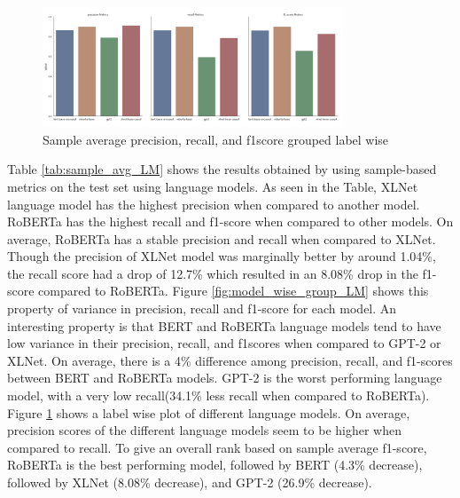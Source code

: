 \begin{figure}[h!]
    \centering
    \includegraphics[width=0.8\textwidth]{thesis/figures/labelwise_wise_prf.png}
    \caption{Sample average precision, recall, and f1score grouped label wise }
    \label{fig:label_wise_group_LM}
\end{figure}
Table \ref{tab:sample_avg_LM} shows the results obtained by using sample-based metrics on the test set using language models. As seen in the Table, XLNet language model has the highest precision when compared to another model.  RoBERTa has the highest recall and f1-score when compared to other models. On average, RoBERTa has a stable precision and recall when compared to XLNet. Though the precision of XLNet model was marginally better by around 1.04\%, the recall score had a drop of 12.7\%  which resulted in an 8.08\% drop in the f1-score compared to RoBERTa. Figure \ref{fig:model_wise_group_LM} shows this property of variance in precision, recall and f1-score for each model. An interesting property is that BERT and RoBERTa language models tend to have low variance in their precision, recall, and f1scores when compared to GPT-2 or XLNet. On average, there is a 4\% difference among precision, recall, and f1-scores between BERT and RoBERTa models. GPT-2 is the worst performing language model, with a very low recall(34.1\% less recall when compared to RoBERTa). Figure \ref{fig:label_wise_group_LM} shows a label wise plot of different language models. On average, precision scores of the different language models seem to be higher when compared to recall. To give an overall rank based on sample average f1-score, RoBERTa is the best performing model, followed by BERT (4.3\% decrease), followed by XLNet (8.08\% decrease), and GPT-2 (26.9\% decrease). 


